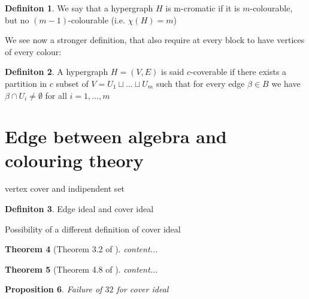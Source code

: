 \documentclass[]{book}
\theoremstyle{plain}
\newtheorem{teo}{Theorem}[section]
\newtheorem{prop}[teo]{Proposition}
\theoremstyle{remark}
\theoremstyle{definition}
\newtheorem{deff}[teo]{Definiton}
\begin{document}
\begin{deff}
We say that a hypergraph $ H $ is m-cromatic if it is $ m $-colourable, but no $ (m-1) $-colourable (i.e. $\chi(H) = m  $)
\end{deff}

We see now a stronger definition, that also require at every block to have vertices of every colour:

\begin{deff}
A hypergraph $ H = (V,E) $ is said $ c $-coverable if there exists a partition in $ c $ subset of $ V = U_1 \sqcup ... \sqcup U_m $ such that for every edge $ \beta \in B $ we have $ \beta \cap U_i \neq \emptyset$ for all $ i = 1, ... , m $
\end{deff}

\section{Edge between algebra and colouring theory}

vertex cover and indipendent set

\begin{deff}\label{def:coverideal}
Edge ideal and cover ideal
\end{deff}

Possibility of a different definition of cover ideal

\begin{teo}[Theorem 3.2 of \cite{Fran10Colourings}] \label{teo:col:chi}
content...
\end{teo}

\begin{teo}[Theorem 4.8 of \cite{Bal21Steiner}] \label{teo:col:cont}
content...
\end{teo}


\begin{prop}
Failure of $ 32 $ for cover ideal
\end{prop}
\backmatter
\printbibliography
\end{document}
